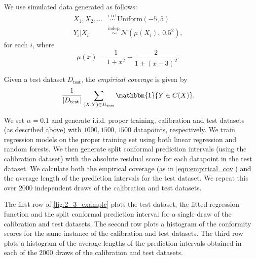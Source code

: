 \documentclass[11pt, titlepage]{article} %
\newcommand{\R}{\mathrm}
\numberwithin{equation}{section}
\theoremstyle{definition}
\numberwithin{theorem}{section}
\numberwithin{lemma}{section}
\numberwithin{corollary}{section}
\numberwithin{proposition}{section}
\numberwithin{definition}{section}
\numberwithin{remark}{section}
\begin{document}
\noindent
We use simulated data generated as follows: \begin{align*}
    X_1, X_2, \ldots &\overset{\R{i.i.d.}}{\sim} \R{Uniform}(-5, 5) \\
    Y_i | X_i &\overset{\R{indep.}}{\sim} \mathcal{N}\left( \mu(X_i), \ 0.5^2 \right),
\end{align*} for each \(i\), where \[\mu(x) = \frac{1}{1+x^2} + \frac{2}{1+(x-3)^2}.\] 

\noindent
Given a test dataset \(D_\R{test}\), the \textit{empirical coverage} is given by \begin{equation}
    \frac{1}{|D_\R{test}|} \sum_{(X, Y) \in D_\R{test}} \mathbbm{1}\{ Y \in C(X) \}.
\label{eqn:empirical_cov}
\end{equation}

\noindent
We set \(\alpha = 0.1\) and generate i.i.d. proper training, calibration and test datasets (as described above) with \(1000, 1500, 1500\) datapoints, respectively. We train regression models on the proper training set using both linear regression and random forests. We then generate split conformal prediction intervals (using the calibration dataset) with the absolute residual score for each datapoint in the test dataset. We calculate both the empirical coverage (as in \eqref{eqn:empirical_cov}) and the average length of the prediction intervals for the test dataset. We repeat this over \(2000\) independent draws of the calibration and test datasets. \vskip5pt

\noindent
The first row of \cref{fig:2_3_example} plots the test dataset, the fitted regression function and the split conformal prediction interval for a single draw of the calibration and test datasets. The second row plots a histogram of the conformity scores for the same instance of the calibration and test datasets. The third row plots a histogram of the average lengths of the prediction intervals obtained in each of the \(2000\) draws of the calibration and test datasets. \vskip5pt
\end{document}

